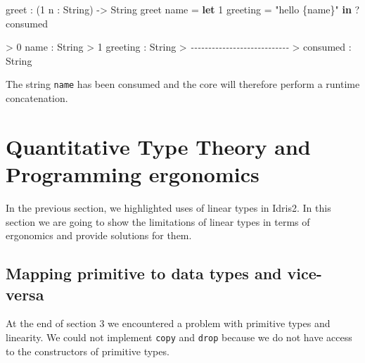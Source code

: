 \documentclass[
]{article}
\newenvironment{Shaded}{}{}
\newcommand{\CommentTok}[1]{\textcolor[rgb]{0.38,0.63,0.69}{\textit{#1}}}
\newcommand{\DataTypeTok}[1]{\textcolor[rgb]{0.56,0.13,0.00}{#1}}
\newcommand{\DecValTok}[1]{\textcolor[rgb]{0.25,0.63,0.44}{#1}}
\newcommand{\KeywordTok}[1]{\textcolor[rgb]{0.00,0.44,0.13}{\textbf{#1}}}
\newcommand{\NormalTok}[1]{#1}
\newcommand{\OperatorTok}[1]{\textcolor[rgb]{0.40,0.40,0.40}{#1}}
\newcommand{\OtherTok}[1]{\textcolor[rgb]{0.00,0.44,0.13}{#1}}
\newcommand{\StringTok}[1]{\textcolor[rgb]{0.25,0.44,0.63}{#1}}
\begin{document}
\begin{Shaded}
\begin{Highlighting}[]
\NormalTok{greet }\OperatorTok{:}\NormalTok{ (}\DecValTok{1}\NormalTok{ n }\OperatorTok{:} \DataTypeTok{String}\NormalTok{) }\OtherTok{{-}\textgreater{}} \DataTypeTok{String}
\NormalTok{greet name }\OtherTok{=} \KeywordTok{let} \DecValTok{1}\NormalTok{ greeting }\OtherTok{=} \StringTok{"hello \{name\}"} \KeywordTok{in} \OperatorTok{?}\NormalTok{consumed}
\end{Highlighting}
\end{Shaded}

\begin{Shaded}
\begin{Highlighting}[]
\OperatorTok{\textgreater{}} \DecValTok{0}\NormalTok{ name }\OperatorTok{:} \DataTypeTok{String}
\OperatorTok{\textgreater{}} \DecValTok{1}\NormalTok{ greeting }\OperatorTok{:} \DataTypeTok{String}
\OperatorTok{\textgreater{}} \CommentTok{{-}{-}{-}{-}{-}{-}{-}{-}{-}{-}{-}{-}{-}{-}{-}{-}{-}{-}{-}{-}{-}{-}{-}{-}{-}{-}{-}{-}}
\OperatorTok{\textgreater{}}\NormalTok{ consumed }\OperatorTok{:} \DataTypeTok{String}
\end{Highlighting}
\end{Shaded}

The string \texttt{name} has been consumed and the core will therefore
perform a runtime concatenation.

\newpage

\hypertarget{quantitative-type-theory-and-programming-ergonomics}{%
\section{Quantitative Type Theory and Programming
ergonomics}\label{quantitative-type-theory-and-programming-ergonomics}}

In the previous section, we highlighted uses of linear types in Idris2.
In this section we are going to show the limitations of linear types in
terms of ergonomics and provide solutions for them.

\hypertarget{mapping-primitive-to-data-types-and-vice-versa}{%
\subsection{Mapping primitive to data types and
vice-versa}\label{mapping-primitive-to-data-types-and-vice-versa}}

At the end of section 3 we encountered a problem with primitive types
and linearity. We could not implement \texttt{copy} and \texttt{drop}
because we do not have access to the constructors of primitive types.
\end{document}

